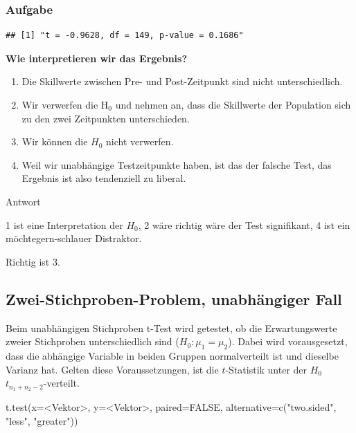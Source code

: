 \documentclass[
]{book}
\newenvironment{Shaded}{\begin{snugshade}}{\end{snugshade}}
\newcommand{\AttributeTok}[1]{\textcolor[rgb]{0.77,0.63,0.00}{#1}}
\newcommand{\ConstantTok}[1]{\textcolor[rgb]{0.00,0.00,0.00}{#1}}
\newcommand{\FunctionTok}[1]{\textcolor[rgb]{0.00,0.00,0.00}{#1}}
\newcommand{\NormalTok}[1]{#1}
\newcommand{\SpecialCharTok}[1]{\textcolor[rgb]{0.00,0.00,0.00}{#1}}
\newcommand{\StringTok}[1]{\textcolor[rgb]{0.31,0.60,0.02}{#1}}
\begin{document}
\hypertarget{aufgabe-6}{%
\subsubsection{Aufgabe}\label{aufgabe-6}}

\begin{verbatim}
## [1] "t = -0.9628, df = 149, p-value = 0.1686"
\end{verbatim}

\textbf{Wie interpretieren wir das Ergebnis?}

\begin{enumerate}
\def\labelenumi{\arabic{enumi}.}
\item
  Die Skillwerte zwischen Pre- und Post-Zeitpunkt sind nicht unterschiedlich.
\item
  Wir verwerfen die \(\text{H}_0\) und nehmen an, dass die Skillwerte der Population sich zu den zwei Zeitpunkten unterschieden.
\item
  Wir können die \(H_0\) nicht verwerfen.
\item
  Weil wir unabhängige Testzeitpunkte haben, ist das der falsche Test, das Ergebnis ist also tendenziell zu liberal.
\end{enumerate}

Antwort

1 ist eine Interpretation der \(H_0\), 2 wäre richtig wäre der Test signifikant, 4 ist ein möchtegern-schlauer Distraktor.

Richtig ist 3.

\hypertarget{zwei-stichproben-problem-unabhuxe4ngiger-fall}{%
\subsection{Zwei-Stichproben-Problem, unabhängiger Fall}\label{zwei-stichproben-problem-unabhuxe4ngiger-fall}}

Beim unabhängigen Stichproben t-Test wird getestet, ob die Erwartungswerte zweier Stichproben unterschiedlich sind (\(H_0: {\mu}_1 = {\mu}_2\)). Dabei wird vorausgesetzt, dass die abhängige Variable in beiden Gruppen normalverteilt ist und dieselbe Varianz hat. Gelten diese Voraussetzungen, ist die \(t\)-Statistik unter der \(H_0\) \(t_{n_1 + n_2 - 2}\)-verteilt.

\begin{Shaded}
\begin{Highlighting}[]
\FunctionTok{t.test}\NormalTok{(}\AttributeTok{x=}\SpecialCharTok{\textless{}}\NormalTok{Vektor}\SpecialCharTok{\textgreater{}}\NormalTok{, }\AttributeTok{y=}\SpecialCharTok{\textless{}}\NormalTok{Vektor}\SpecialCharTok{\textgreater{}}\NormalTok{, }\AttributeTok{paired=}\ConstantTok{FALSE}\NormalTok{, }
       \AttributeTok{alternative=}\FunctionTok{c}\NormalTok{(}\StringTok{"two.sided"}\NormalTok{, }\StringTok{"less"}\NormalTok{, }\StringTok{"greater"}\NormalTok{))}
\end{Highlighting}
\end{Shaded}
\end{document}
